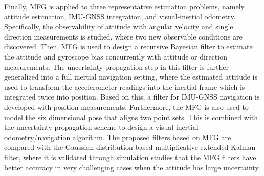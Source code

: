 {Finally, MFG is applied to three representative estimation problems, namely attitude estimation, IMU-GNSS integration, and visual-inertial odometry.
Specifically, the observability of attitude with angular velocity and single direction measurements is studied, where two new observable conditions are discovered.
Then, MFG is used to design a recursive Bayesian filter to estimate the attitude and gyroscope bias concurrently with attitude or direction measurements.
The uncertainty propagation step in this filter is further generalized into a full inertial navigation setting, where the estimated attitude is used to transform the accelerometer readings into the inertial frame which is integrated twice into position.
Based on this, a filter for IMU-GNSS navigation is developed with position measurements.
Furthermore, the MFG is also used to model the six dimensional pose that aligns two point sets.
This is combined with the uncertainty propagation scheme to design a visual-inertial odometry/navigation algorithm.
The proposed filters based on MFG are compared with the Gaussian distribution based multiplicative extended Kalman filter, where it is validated through simulation studies that the MFG filters have better accuracy in very challenging cases when the attitude has large uncertainty.
}
